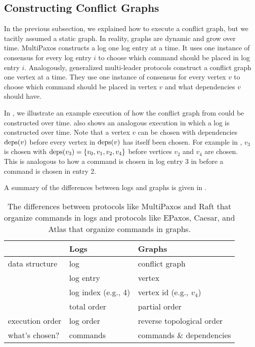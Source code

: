 \subsection{Constructing Conflict Graphs}
In the previous subsection, we explained how to execute a conflict graph, but
we tacitly assumed a static graph. In reality, graphs are dynamic and grow over
time. MultiPaxos constructs a log one log entry at a time. It uses one instance
of consensus for every log entry $i$ to choose which command should be placed
in log entry $i$. Analogously, generalized multi-leader protocols construct a
conflict graph one vertex at a time. They use one instance of consensus for
every vertex $v$ to choose which command should be placed in vertex $v$ and
what dependencies $v$ should have.

In , we illustrate an example execution of how
the conflict graph from  could be constructed over time.
 also shows an analogous execution in which a log
is constructed over time. Note that a vertex $v$ can be chosen with
dependencies $\text{deps}(v)$ before every vertex in $\text{deps}(v)$ has itself been
chosen. For example in , $v_3$ is chosen with $\text{deps}(v_3) =
\{v_0, v_1, v_2, v_4\}$ before vertices $v_2$ and $v_4$ are chosen. This is
analogous to how a command is chosen in log entry 3 in  before a
command is chosen in entry 2.

A summary of the differences between logs and graphs is given in
.

{}

\begin{table}
  \caption{%
    The differences between protocols like MultiPaxos and Raft that organize
    commands in logs and protocols like EPaxos, Caesar, and Atlas that organize
    commands in graphs.
  }
  \begin{tabular}{lll}
    \toprule
                    & Logs                & Graphs \\\midrule
    data structure  & log                 & conflict graph \\
                    & log entry           & vertex \\
                    & log index (e.g., 4) & vertex id (e.g., $v_4$) \\
                    & total order         & partial order \\
    execution order & log order           & reverse topological order \\
    what's chosen?  & commands            & commands \& dependencies \\
    \bottomrule
  \end{tabular}
\end{table}

